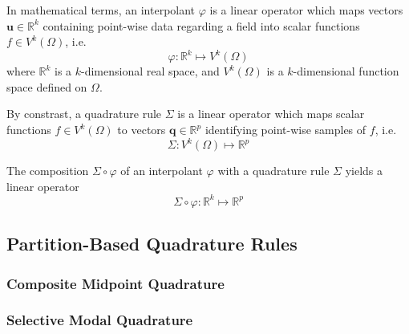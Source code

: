 In mathematical terms, an interpolant $\varphi$ is a linear operator which maps vectors $\mathbf{u} \in \mathbb{R}^k$ containing point-wise data regarding a field into scalar functions $f \in V^k (\Omega)$, i.e.
\begin{equation}
  \varphi \colon \mathbb{R}^k \mapsto V^k (\Omega)
\end{equation}
where $\mathbb{R}^k$ is a $k$-dimensional real space, and $V^k (\Omega)$ is a $k$-dimensional function space defined on $\Omega$.

By constrast, a quadrature rule $\Sigma$ is a linear operator which maps scalar functions $f \in V^k (\Omega)$ to vectors $\mathbf{q} \in \mathbb{R}^p$ identifying point-wise samples of $f$, i.e.
\begin{equation}
  \Sigma \colon V^k (\Omega) \mapsto \mathbb{R}^p
\end{equation}

The composition $\Sigma \circ \varphi$ of an interpolant $\varphi$ with a quadrature rule $\Sigma$ yields a linear operator
\begin{equation}
  \Sigma \circ \varphi \colon \mathbb{R}^k \mapsto \mathbb{R}^p
\end{equation}

\subsection{Partition-Based Quadrature Rules}
		
	\subsubsection*{Composite Midpoint Quadrature}
		
	\subsubsection*{Selective Modal Quadrature}
	
